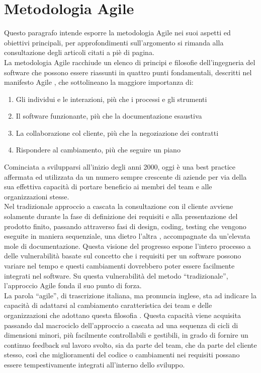 \documentclass[a4paper, 12pt]{report}
\numberwithin{equation}{section}
\begin{document}
\section{Metodologia Agile}\label{agile}
Questo paragrafo intende esporre la metodologia Agile nei suoi aspetti ed obiettivi principali, per approfondimenti sull’argomento si rimanda alla consultazione degli articoli citati a piè di pagina.\\
La metodologia Agile racchiude un elenco di principi e filosofie dell’ingegneria del software che possono essere riassunti in quattro punti fondamentali, descritti nel manifesto Agile \cite{manifesto-agile}, che sottolineano la maggiore importanza di:
\begin{enumerate}
    \item Gli individui e le interazioni, più che i processi e gli strumenti
    \item Il software funzionante, più che la documentazione esaustiva
    \item La collaborazione col cliente, più che la negoziazione dei contratti
    \item Rispondere al cambiamento, più che seguire un piano
\end{enumerate}
Cominciata a svilupparsi all’inizio degli anni 2000, oggi è una best practice affermata ed utilizzata da un numero sempre crescente di aziende per via della sua effettiva capacità di portare beneficio ai membri del team e alle organizzazioni stesse. \\
Nel tradizionale approccio a cascata la consultazione con il cliente avviene solamente durante la fase di definizione dei requisiti e alla presentazione del prodotto finito, passando attraverso fasi di design, coding, testing che vengono eseguite in maniera sequenziale, una dietro l’altra \cite{palmquist-agile}, accompagnate da un'elevata mole di documentazione. Questa visione del progresso espone l’intero processo a delle vulnerabilità basate sul concetto che i requisiti per un software possono variare nel tempo e questi cambiamenti dovrebbero poter essere facilmente integrati nel software. Su questa vulnerabilità del metodo “tradizionale”, l’approccio Agile fonda il suo  punto di forza.\\ 
La parola “agile”, di trascrizione italiana, ma pronuncia inglese, sta ad indicare la capacità di adattarsi al cambiamento caratteristica dei team e delle organizzazioni che adottano questa filosofia \cite{balaji-agile}. Questa capacità viene acquisita passando dal macrociclo dell’approccio a cascata ad una sequenza di cicli di dimensioni minori, più facilmente controllabili e gestibili, in grado di fornire un continuo feedback sul lavoro svolto, sia da parte del team, che da parte del cliente stesso, così che miglioramenti del codice o cambiamenti nei requisiti possano essere tempestivamente integrati all’interno dello sviluppo. \\
\end{document}
